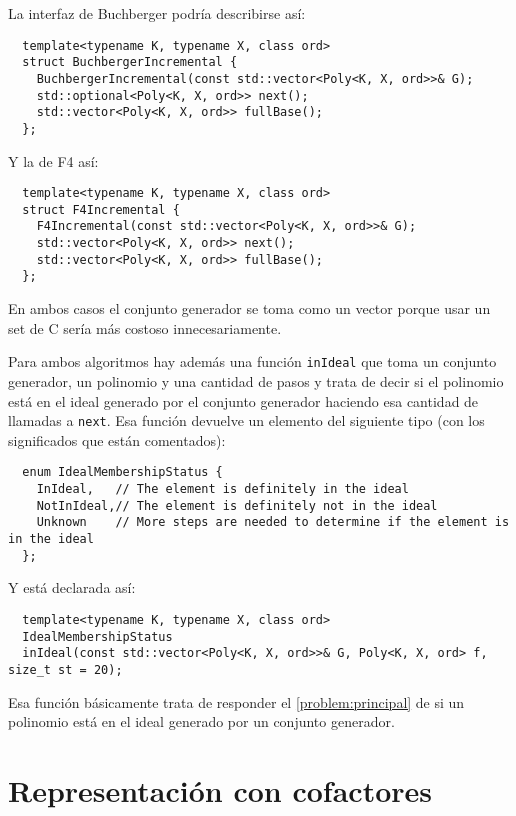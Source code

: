 \documentclass[12pt]{report}
\theoremstyle{customstyle}
\theoremstyle{factstyle}
\newcommand\cpp{C\nolinebreak[4]\hspace{-.05em}\raisebox{.4ex}{\relsize{-3}{\textbf{++}}}\xspace}
\begin{document}
La interfaz de Buchberger podría describirse así:

\begin{verbatim}
  template<typename K, typename X, class ord>
  struct BuchbergerIncremental {
    BuchbergerIncremental(const std::vector<Poly<K, X, ord>>& G);
    std::optional<Poly<K, X, ord>> next();
    std::vector<Poly<K, X, ord>> fullBase();
  };
\end{verbatim}

Y la de F4 así:

\begin{verbatim}
  template<typename K, typename X, class ord>
  struct F4Incremental {
    F4Incremental(const std::vector<Poly<K, X, ord>>& G);
    std::vector<Poly<K, X, ord>> next();
    std::vector<Poly<K, X, ord>> fullBase();
  };
\end{verbatim}

En ambos casos el conjunto generador se toma como un vector porque usar un set de \cpp sería más costoso innecesariamente.

Para ambos algoritmos hay además una función \texttt{inIdeal} que toma un conjunto generador, un polinomio y una cantidad de pasos y trata de decir si el polinomio está en el ideal generado por el conjunto generador haciendo esa cantidad de llamadas a \texttt{next}. Esa función devuelve un elemento del siguiente tipo (con los significados que están comentados):

\begin{verbatim}
  enum IdealMembershipStatus {
    InIdeal,   // The element is definitely in the ideal
    NotInIdeal,// The element is definitely not in the ideal
    Unknown    // More steps are needed to determine if the element is in the ideal
  };
\end{verbatim}

\noindent Y está declarada así:

\begin{verbatim}
  template<typename K, typename X, class ord>
  IdealMembershipStatus
  inIdeal(const std::vector<Poly<K, X, ord>>& G, Poly<K, X, ord> f, size_t st = 20);
\end{verbatim}

Esa función básicamente trata de responder el \cref{problem:principal} de si un polinomio está en el ideal generado por un conjunto generador.

\section{Representación con cofactores}\label{section:representación con cofactores (librería)}
\end{document}
